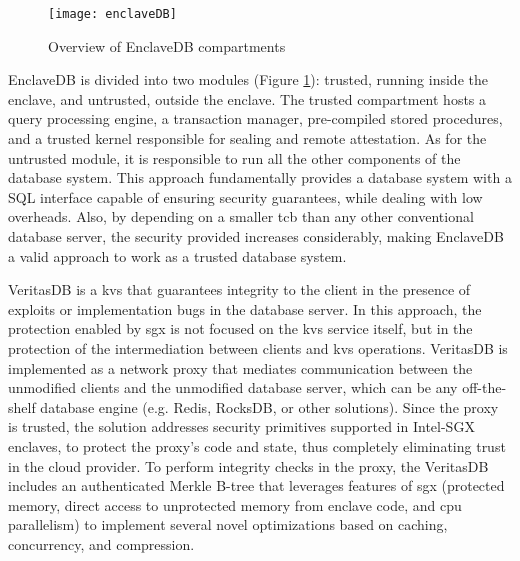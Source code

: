\begin{figure}[htbp]
	\centering
	{\texttt{[image: enclaveDB]}}
	\caption{Overview of EnclaveDB compartments}
	\label{fig:enclaveDB}
\end{figure}
 
EnclaveDB is divided into two modules (Figure \ref{fig:enclaveDB}): trusted, running inside the enclave, and untrusted, outside the enclave. The trusted compartment hosts a query processing engine, a transaction manager, pre-compiled stored procedures, and a trusted kernel responsible for sealing and remote attestation. As for the untrusted module, it is responsible to run all the other components of the database system. 
This approach fundamentally provides a database system with a SQL interface capable of ensuring security guarantees, while dealing with low overheads. Also, by depending on a smaller \gls{tcb} than any other conventional database server, the security provided increases considerably, making EnclaveDB a valid approach to work as a trusted database system.

VeritasDB \cite{veritasDB} is a \gls{kvs} that guarantees integrity to the client in the presence of exploits or implementation bugs in the database server. In this approach, the protection enabled by \gls{sgx} is not focused on the \gls{kvs} service itself, but in the protection of the intermediation between clients and \gls{kvs} operations. VeritasDB is implemented as a network proxy that mediates communication between the unmodified clients and the unmodified database server, which can be any off-the-shelf database engine (e.g. Redis, RocksDB, or other solutions). Since the proxy is trusted, the solution addresses security primitives supported in Intel-SGX enclaves, to protect the proxy’s code and state, thus completely eliminating trust in the cloud provider. To perform integrity checks in the proxy, the VeritasDB includes an authenticated Merkle B-tree that leverages features of \gls{sgx} (protected memory, direct access to unprotected memory from enclave code, and \gls{cpu} parallelism) to implement several novel optimizations based on caching, concurrency, and compression.

